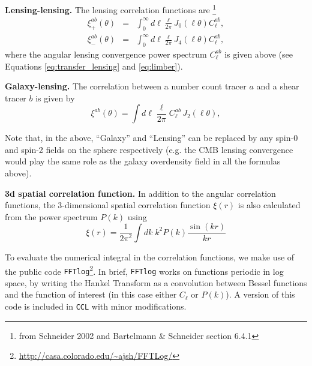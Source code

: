 \documentclass[\docopts]{\docclass}
\newcommand{\ccl}{{\tt CCL}\xspace}
\begin{document}
{\bf Lensing-lensing.} The lensing correlation functions are \footnote{from Schneider 2002 and Bartelmann \& Schneider section 6.4.1}
\begin{eqnarray}
  \xi^{ab}_{+}(\theta)&=&\int_0^{\infty}d\ell\frac{\ell}{2\pi}J_0(\ell\theta)C^{ab}_\ell,\\
  \xi^{ab}_{-}(\theta)&=&\int_0^{\infty}d\ell\frac{\ell}{2\pi}J_4(\ell\theta)C^{ab}_\ell,
\label{eq:xipxim}
\end{eqnarray}
where the angular lensing convergence power spectrum $C^{ab}_\ell$ is given above (see Equations \ref{eq:transfer_lensing} and \ref{eq:limber}).

{\bf Galaxy-lensing.} The correlation between a number count tracer $a$ and a shear tracer $b$ is given by
\begin{equation}
  \xi^{ab}(\theta) = \int d\ell \frac{\ell}{2\pi} C^{ab}_\ell\, J_2(\ell\theta),
\end{equation}

Note that, in the above, ``Galaxy'' and ``Lensing'' can be replaced by any spin-0 and spin-2 fields on the sphere respectively (e.g. the CMB lensing convergence would play the same role as the galaxy overdensity field in all the formulas above).

{\bf 3d spatial correlation function.} In addition to the angular correlation functions, the 3-dimensional spatial correlation function $\xi(r)$ is also 
calculated from the power spectrum $P(k)$ using
\begin{equation}
\xi(r) = \frac{1}{2 \pi^2} \int dk \; k^2 P(k) \frac{\sin(kr)}{kr}
\end{equation}


To evaluate the numerical integral in the correlation functions, we make use of the public code {\tt FFTlog}\footnote{\url{http://casa.colorado.edu/~ajsh/FFTLog/}}\citep{Hamilton2000,Talman2009}. In brief, {\tt FFTlog} works on functions periodic in log space, by writing the Hankel Transform as a convolution between Bessel functions and the function of interest (in this case either $C_\ell$ or $P(k)$). A version of this code is included in \ccl with minor modifications.

%
%
\end{document}
